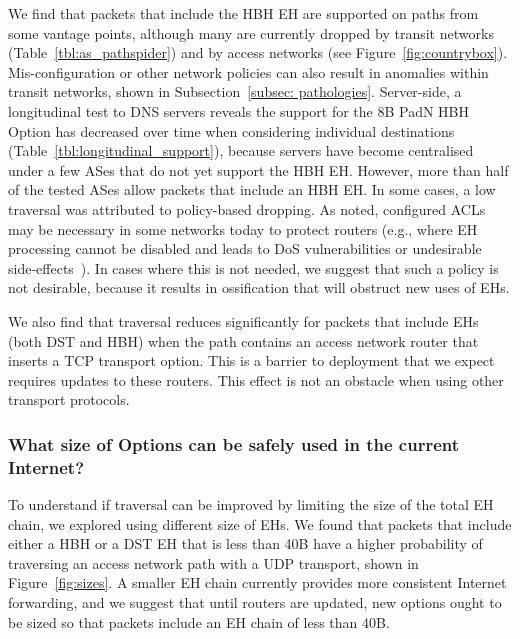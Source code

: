 \documentclass[conference]{IEEEtran}
\begin{document}
We find that packets that include the HBH EH are supported on paths from some vantage points, although many are currently dropped by transit networks (Table~\ref{tbl:as_pathspider}) and by access networks (see Figure~\ref{fig:countrybox}). Mis-configuration or other network policies can also result in anomalies within transit networks, shown in Subsection~\ref{subsec: pathologies}. 
Server-side, a longitudinal test to DNS servers reveals the support for the 8B PadN HBH Option has decreased over time when considering individual destinations (Table~\ref{tbl:longitudinal_support}), because servers have become centralised under a few ASes that do not yet support the HBH EH.  However, more than half of the tested ASes allow packets that include an HBH EH. 
In some cases, a low traversal was attributed to policy-based dropping. As noted, configured ACLs may be necessary in some networks today to protect routers (e.g., where EH processing cannot be disabled and leads to DoS vulnerabilities or undesirable side-effects~\cite{passive-threats}). In cases where this is not needed, we suggest that such a policy is not desirable, because it results in ossification that will obstruct new uses of EHs.

We also find that traversal reduces significantly for packets that include EHs (both DST and HBH) when the path contains an access network router that inserts a TCP transport option. This is a barrier to deployment that we expect requires updates to these routers. This effect is not an obstacle when using other transport protocols.



\subsubsection{What size of Options can be safely used in the current Internet?}

To understand if traversal can be improved by limiting the size of the total EH chain, we explored using different size of EHs. We found that packets that include either a HBH or a DST EH that is less than 40B have a higher probability of traversing an access network path with a UDP transport, shown in Figure~\ref{fig:sizes}.
A smaller EH chain currently provides more consistent Internet forwarding, and we suggest that until routers are updated, new options ought to be sized so that packets include an EH chain of less than 40B.
\end{document}
